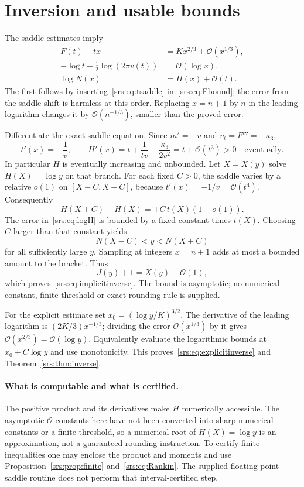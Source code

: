 \documentclass[11pt]{article}
\numberwithin{equation}{section}
\theoremstyle{remark}\newtheorem{remark}[theorem]{Remark}
\newcommand{\Oh}{\mathcal O}
\begin{document}
\section{Inversion and usable bounds}\label{srs:sec:inverse}
The saddle estimates imply
\begin{align}
 F(t)+tx&=Kx^{2/3}+\Oh(x^{1/3}),\label{srs:eq:saddlelog}\\
 -\log t-\tfrac12\log(2\pi v(t))&=\Oh(\log x),\nonumber\\
 \log N(x)&=H(x)+\Oh(t).\label{srs:eq:logH}
\end{align}
The first follows by inserting~\eqref{srs:eq:tsaddle} in~\eqref{srs:eq:Fbound}; the error from the saddle shift is harmless at this order. Replacing $x=n+1$ by $n$ in the leading logarithm changes it by $\Oh(n^{-1/3})$, smaller than the proved error.

Differentiate the exact saddle equation. Since $m'=-v$ and $v_t=F'''=-\kappa_3$,
\begin{equation}
 t'(x)=-\frac1v,\qquad
 H'(x)=t+\frac1{tv}-\frac{\kappa_3}{2v^2}
       =t+\Oh(t^3)>0\quad\text{eventually}.\label{srs:eq:Hprime}
\end{equation}
In particular $H$ is eventually increasing and unbounded. Let $X=X(y)$ solve $H(X)=\log y$ on that branch. For each fixed $C>0$, the saddle varies by a relative $o(1)$ on $[X-C,X+C]$, because $t'(x)=-1/v=\Oh(t^4)$. Consequently
\[
 H(X\pm C)-H(X)=\pm C\,t(X)(1+o(1)).
\]
The error in~\eqref{srs:eq:logH} is bounded by a fixed constant times $t(X)$. Choosing $C$ larger than that constant yields
\[
 N(X-C)<y<N(X+C)
\]
for all sufficiently large $y$. Sampling at integers $x=n+1$ adds at most a bounded amount to the bracket. Thus
\[
 J(y)+1=X(y)+\Oh(1),
\]
which proves~\eqref{srs:eq:implicitinverse}. The bound is asymptotic; no numerical constant, finite threshold or exact rounding rule is supplied.

For the explicit estimate set $x_0=(\log y/K)^{3/2}$. The derivative of the leading logarithm is $(2K/3)x^{-1/3}$; dividing the error $\Oh(x^{1/3})$ by it gives $\Oh(x^{2/3})=\Oh(\log y)$. Equivalently evaluate the logarithmic bounds at $x_0\pm C\log y$ and use monotonicity. This proves~\eqref{srs:eq:explicitinverse} and Theorem~\ref{srs:thm:inverse}.

\paragraph{What is computable and what is certified.}
The positive product and its derivatives make $H$ numerically accessible. The asymptotic $\Oh$ constants here have not been converted into sharp numerical constants or a finite threshold, so a numerical root of $H(X)=\log y$ is an approximation, not a guaranteed rounding instruction. To certify finite inequalities one may enclose the product and moments and use Proposition~\ref{srs:prop:finite} and~\eqref{srs:eq:Rankin}. The supplied floating-point saddle routine does not perform that interval-certified step.
\end{document}
